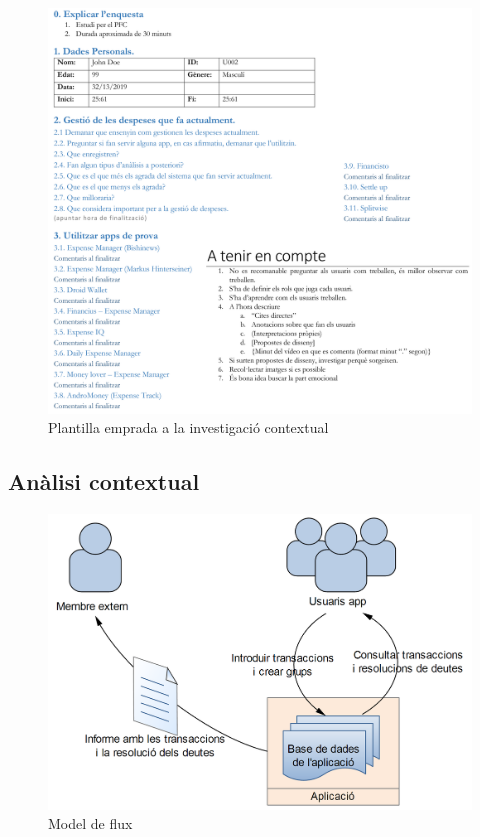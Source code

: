 \begin{figure}[htp]
\centering
\includegraphics[scale=0.75]{plantilla_analisi.png}
\caption{Plantilla emprada a la investigació contextual}\label{fig:plantilla_analisi}
\end{figure}

\subsection{Anàlisi contextual}

\begin{figure}[htp]
\centering
\includegraphics[scale=1]{flow_model.png}
\caption{Model de flux}\label{fig:flow_model}
\end{figure}